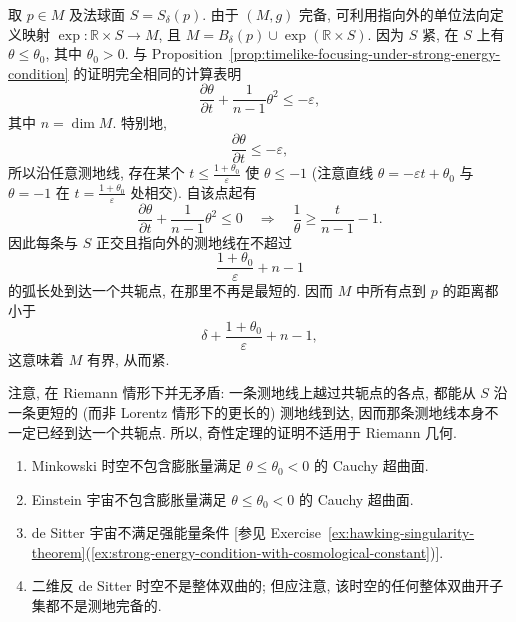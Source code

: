 \begin{description}[font=\normalfont,leftmargin=2em,labelwidth=1.5em]
取 $p\in M$ 及法球面 $S=S_\delta(p)$. 由于 $(M,g)$ 完备, 可利用指向外的单位法向定义映射 $\exp:\mathbb{R}\times S\to M$, 且 $M=B_\delta(p)\cup\exp(\mathbb{R}\times S)$. 因为 $S$ 紧, 在 $S$ 上有 $\theta\leq\theta_0$, 其中 $\theta_0>0$. 与 Proposition~\ref{prop:timelike-focusing-under-strong-energy-condition} 的证明完全相同的计算表明
\[
  \frac{\partial\theta}{\partial t}+\frac{1}{n-1}\theta^2\leq-\varepsilon,
\]
其中 $n=\dim M$. 特别地,
\[
  \frac{\partial\theta}{\partial t}\leq-\varepsilon,
\]
所以沿任意测地线, 存在某个 $t\leq\frac{1+\theta_0}{\varepsilon}$ 使 $\theta\leq-1$ (注意直线 $\theta=-\varepsilon t+\theta_0$ 与 $\theta=-1$ 在 $t=\frac{1+\theta_0}{\varepsilon}$ 处相交). 自该点起有
\[
  \frac{\partial\theta}{\partial t}+\frac{1}{n-1}\theta^2\leq0
  \quad\Longrightarrow\quad
  \frac{1}{\theta}\geq\frac{t}{n-1}-1.
\]
因此每条与 $S$ 正交且指向外的测地线在不超过
\[
  \frac{1+\theta_0}{\varepsilon}+n-1
\]
的弧长处到达一个共轭点, 在那里不再是最短的. 因而 $M$ 中所有点到 $p$ 的距离都小于
\[
  \delta+\frac{1+\theta_0}{\varepsilon}+n-1,
\]
这意味着 $M$ 有界, 从而紧.

注意, 在 Riemann 情形下并无矛盾: 一条测地线上越过共轭点的各点, 都能从 $S$ 沿一条更短的 (而非 Lorentz 情形下的更长的) 测地线到达, 因而那条测地线本身不一定已经到达一个共轭点. 所以, 奇性定理的证明不适用于 Riemann 几何.

\begin{enumerate}[label=(\alph*),ref=\alph*,leftmargin=*]
\item Minkowski 时空不包含膨胀量满足 $\theta\leq\theta_0<0$ 的 Cauchy 超曲面.
\item Einstein 宇宙不包含膨胀量满足 $\theta\leq\theta_0<0$ 的 Cauchy 超曲面.
\item de Sitter 宇宙不满足强能量条件 [参见 Exercise~\ref{ex:hawking-singularity-theorem}(\ref{ex:strong-energy-condition-with-cosmological-constant})].
\item 二维反 de Sitter 时空不是整体双曲的; 但应注意, 该时空的任何整体双曲开子集都不是测地完备的.
\end{enumerate}
\end{description}
